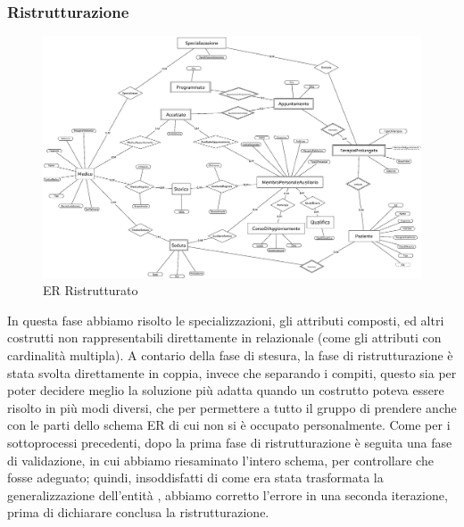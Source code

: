 \documentclass[11pt]{article}
\begin{document}
\subsubsection{Ristrutturazione}
\begin{figure}[H]
    \includegraphics[width=\linewidth]{images/ER_Ristrutturato2.png}
    \caption{ER Ristrutturato}
    \label{fig:ER_Ristrutturato}
\end{figure}
In questa fase abbiamo risolto le specializzazioni, gli attributi composti, ed altri costrutti non rappresentabili direttamente in relazionale (come gli attributi con cardinalità multipla). A contario della fase di stesura, la fase di ristrutturazione è stata svolta direttamente in coppia, invece che separando i compiti, questo sia per poter decidere meglio la soluzione più adatta quando un costrutto poteva essere risolto in più modi diversi, che per permettere a tutto il gruppo di prendere  anche con le parti dello schema ER di cui non si è occupato personalmente.
Come per i sottoprocessi precedenti, dopo la prima fase di ristrutturazione è seguita una fase di validazione, in cui abbiamo riesaminato l'intero schema, per controllare che fosse adeguato; quindi, insoddisfatti di come era stata trasformata la generalizzazione dell'entità , abbiamo corretto l'errore in una seconda iterazione, prima di dichiarare conclusa la ristrutturazione.
\end{document}
